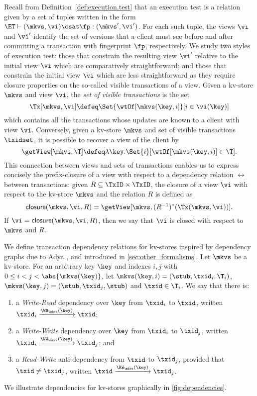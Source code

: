 Recall from Definition~\ref{def:execution.test} that an execution test is a relation
given by a set of tuples written in the form
$\ET \vdash (\mkvs,\vi) \csat \fp: (\mkvs', \vi')$. 
For each such tuple, the views $\vi$ and $\vi'$ identify the set 
of versions that a client must see before and after committing a transaction 
with fingerprint $\fp$, respectively.
We study 
two styles of execution test: those that constrain the resulting view
$\vi'$ relative to the initial view $\vi$ which are comparatively straightforward; and those that constrain the initial view $\vi$ which
are less straightforward as they require closure properties on the
so-called visible transactions of a view. 
Given a kv-store $\mkvs$ and view $\vi$, the {\em set of visible
  transactions} is the set 
 \[
\Tx[\mkvs, \vi] \defeq
\Set{\wtOf[\mkvs(\key, i] }[ i \in \vi(\key)]
\]
which contains all the transactions whose updates are known to a
client with view $\vi$.  Conversely, given a kv-store $\mkvs$ and set
of visible transactions $\txidset$, it is possible to recover a view
of the client by
\[
\getView[\mkvs, \T] \defeq \lambda \key. \Set{i }[
\wtOf[\mkvs(\key, i)] \in \T].
\]
This connection between views and sets of transactions enables us to express concisely 
the prefix-closure of a view with respect to a dependency relation $\rel$ between 
transactions: given $R \subseteq \TxID \times \TxID$, the closure of 
a view $\vi$ with respect to the kv-store $\mkvs$ and the relation $R$
is defined as 
\[
\mathsf{closure}(\mkvs, \vi, R)
= \getView[\mkvs, (R^{-1})^{\ast}(\Tx(\mkvs, \vi))].
\]
If $\vi = \mathsf{closure}(\mkvs, \vi, R)$, then we say that $\vi$ is closed with 
respect to $\mkvs$ and $R$.


We define transaction dependency
relations for kv-stores inspired by dependency graphs due to Adya \cite{adya}, and 
introduced in \ref{sec:other_formalisms}.
Let $\mkvs$ be a kv-store. For an arbitrary key $\key$ and 
indexes $i,j$ with  $0 \leq i < j < \abs{ \mkvs(\key) }$, let 
$\mkvs(\key, i)  = (\stub, \txid_{i}, \T_{i})$, $\mkvs(\key,j)  =
(\stub, \txid_{j}, \stub) $
and $\txid \in \T_{i}$. We say that there is:
\begin{enumerate} 
\item a \emph{Write-Read} dependency over 
$\key$ from $\txid_{i}$ to $\txid$, written $\txid_{i} \xrightarrow{\WR_{\mkvs}(\key)} \txid$;
\item a \emph{Write-Write} dependency over $\key$ from $\txid_{i}$ to $\txid_{j}$, 
written $\txid_{i} \xrightarrow{\WW_{\mkvs}(\key)} \txid_{j}$; and 
\item a \emph{Read-Write} anti-dependency from $\txid$ to $\txid_{j}$, provided that 
$\txid \neq \txid_{j}$, written $\txid \xrightarrow{\RW_{\mkvs}(\key)} \txid_{j}$.
\end{enumerate}
\noindent We illustrate dependencies for kv-stores graphically in \ref{fig:dependencies}.

